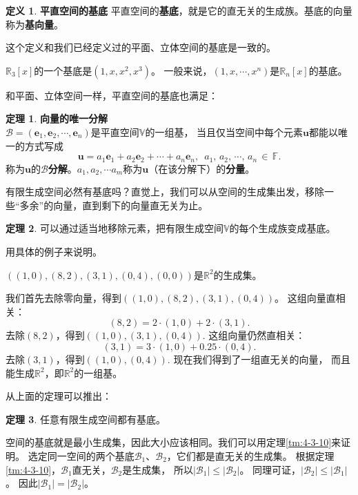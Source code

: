\documentclass[12pt,UTF8]{ctexbook}
\theoremstyle{definition}
\newtheorem{df}{定义}[section]
\newtheorem{tm}{定理}[section]
\theoremstyle{plain}
\begin{document}
\begin{df}{\textbf{平直空间的基底}}
    平直空间的\textbf{基底}，就是它的直无关的生成族。基底的向量称为\textbf{基向量}。
\end{df}

这个定义和我们已经定义过的平面、立体空间的基底是一致的。

$\mathbb{R}_3[x]$的一个基底是$(1, x, x^2, x^3)$。
一般来说，$(1, x, \cdots, x^n)$是$\mathbb{R}_n[x]$的基底。

和平面、立体空间一样，平直空间的基底也满足：
\begin{tm}{\textbf{向量的唯一分解}}\label{tm:4-3-20}\\
    $ \mathcal{B} = (\mathbf{e}_1, \mathbf{e}_2, \cdots , \mathbf{e}_n )$是平直空间$\mathbb{V}$的一组基，
    当且仅当空间中每个元素$\mathbf{u}$都能以唯一的方式写成
    $$ \mathbf{u} = a_1\mathbf{e}_1 +a_2 \mathbf{e}_2 + \cdots + a_n\mathbf{e}_n, \,\,\, a_1,\,a_2,\,\cdots,\, a_n \,\in\,\mathbb{F}.$$
    称为$\mathbf{u}$的$\mathcal{B}$\textbf{分解}。$a_1, a_2, \cdots a_m$称为$\mathbf{u}$（在该分解下）的\textbf{分量}。
\end{tm}

有限生成空间必然有基底吗？直觉上，我们可以从空间的生成集出发，移除一些“多余”的向量，直到剩下的向量直无关为止。

\begin{tm}\label{tm:4-3-40}
    可以通过适当地移除元素，把有限生成空间$\mathbb{V}$的每个生成族变成基底。
\end{tm}

用具体的例子来说明。

$\left((1,0),(8,2),(3,1),(0,4),(0,0)\right)$是$\mathbb{R}^2$的生成集。

我们首先去除零向量，得到$\left((1,0),(8,2),(3,1),(0,4)\right)$。 
这组向量直相关：
$$ (8,2) = 2\cdot(1,0) + 2\cdot(3,1).$$
去除$(8,2)$，得到$\left((1,0),(3,1),(0,4)\right).$ 这组向量仍然直相关：
$$ (3,1) = 3\cdot(1,0) + 0.25\cdot(0,4).$$
去除$(3,1)$，得到$\left((1,0),(0,4)\right).$ 现在我们得到了一组直无关的向量，
而且能生成$\mathbb{R}^2$，即$\mathbb{R}^2$的一组基。

从上面的定理可以推出：
\begin{tm}\label{tm:4-3-50}
    任意有限生成空间都有基底。
\end{tm}

空间的基底就是最小生成集，因此大小应该相同。我们可以用定理\ref{tm:4-3-10}来证明。
选定同一空间的两个基底$\mathcal{B}_1$、$\mathcal{B}_2$，它们都是直无关的生成集。
根据定理\ref{tm:4-3-10}，$\mathcal{B}_1$直无关，$\mathcal{B}_2$是生成集，
所以$|\mathcal{B}_1| \leqslant |\mathcal{B}_2|$。
同理可证，$|\mathcal{B}_2| \leqslant |\mathcal{B}_1|$。
因此$|\mathcal{B}_1| = |\mathcal{B}_2|$。
\end{document}
